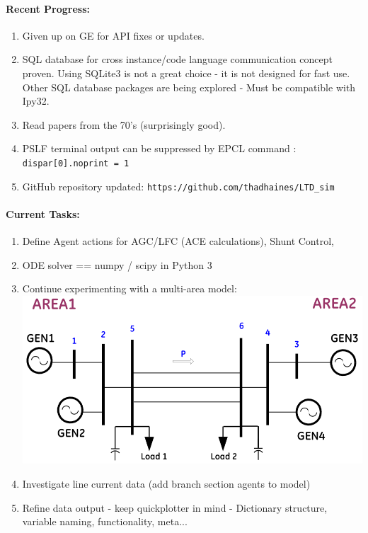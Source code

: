 \documentclass[12pt]{article}
\begin{document}
	\paragraph{Recent Progress:}
	\begin{enumerate}
		\item Given up on GE for API fixes or updates.
		
		\item SQL database for cross instance/code language communication concept proven.
		\subitem Using SQLite3 is not a great choice - it is not designed for fast use.
		\subitem Other SQL database packages are being explored - Must be compatible with Ipy32.
		
		\item Read papers from the 70's (surprisingly good).
		
		\item PSLF terminal output can be suppressed by EPCL command : \verb|dispar[0].noprint = 1|
		
		\item GitHub repository updated:
		\subitem \verb|https://github.com/thadhaines/LTD_sim|
		
	\end{enumerate}
\paragraph{Current Tasks:}
	\begin{enumerate}
		\item Define Agent actions for AGC/LFC (ACE calculations), Shunt Control, 
		\item ODE solver == numpy / scipy in Python 3
		
		\item Continue experimenting with a multi-area model:\\
		\includegraphics[width=\linewidth]{g4aSys}
		\item Investigate line current data (add branch section agents to model)
		
		\item Refine data output - keep quickplotter in mind - Dictionary structure, variable naming, functionality, meta...
	\end{enumerate}
\pagebreak
\end{document}
